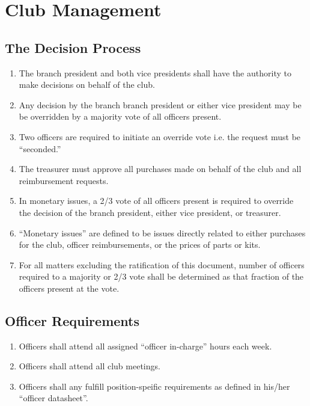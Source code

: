\documentclass{article}
\begin{document}
\section{Club Management}

\subsection{The Decision Process}
\begin{enumerate}
\item The branch president and both vice presidents shall have the authority to make decisions on behalf of the club.
\item Any decision by the branch branch president or either vice president may be be overridden by a majority vote of all officers present.
\item Two officers are required to initiate an override vote i.e. the request must be ``seconded.''
\item The treasurer must approve all purchases made on behalf of the club and all reimbursement requests.
\item In monetary issues, a 2/3 vote of all officers present is required to override the decision of the branch president, either vice president, or treasurer.
\item ``Monetary issues'' are defined to be issues directly related to either purchases for the club, officer reimbursements, or the prices of parts or kits.
\item For all matters excluding the ratification of this document, number of officers required to a majority or 2/3 vote shall be determined as that fraction of the officers present at the vote.
\end{enumerate}

\subsection{Officer Requirements}
\begin{enumerate}
\item Officers shall attend all assigned ``officer in-charge'' hours each week.
\item Officers shall attend all club meetings.
\item Officers shall any fulfill position-speific requirements as defined in his/her ``officer datasheet''.
\end{enumerate}
\end{document}
